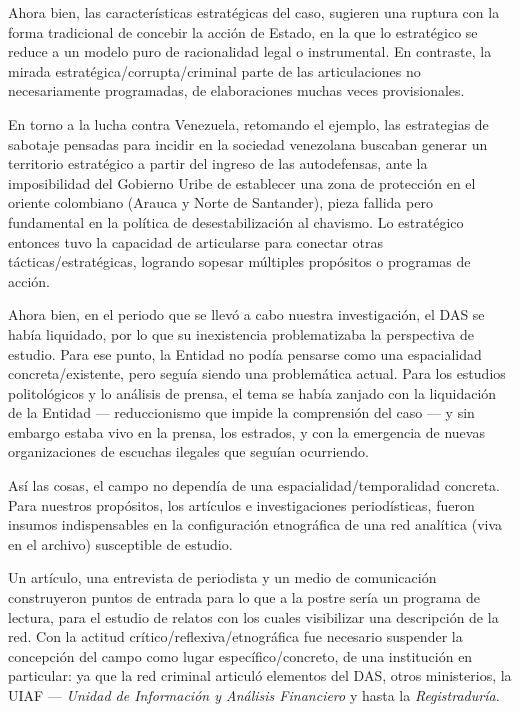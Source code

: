 \documentclass[
  spanish,
  11pt,
  a4paper,
]{scrbook}
\begin{document}
Ahora bien, las características estratégicas del caso, sugieren una
ruptura con la forma tradicional de concebir la acción de Estado, en la
que lo estratégico se reduce a un modelo puro de racionalidad legal o
instrumental. En contraste, la mirada estratégica/corrupta/criminal
parte de las articulaciones no necesariamente programadas, de
elaboraciones muchas veces provisionales.

En torno a la lucha contra Venezuela, retomando el ejemplo, las
estrategias de sabotaje pensadas para incidir en la sociedad venezolana
buscaban generar un territorio estratégico a partir del ingreso de las
autodefensas, ante la imposibilidad del Gobierno Uribe de establecer una
zona de protección en el oriente colombiano (Arauca y Norte de
Santander), pieza fallida pero fundamental en la política de
desestabilización al chavismo. Lo estratégico entonces tuvo la capacidad
de articularse para conectar otras tácticas/estratégicas, logrando
sopesar múltiples propósitos o programas de acción.

Ahora bien, en el periodo que se llevó a cabo nuestra investigación, el
DAS se había liquidado, por lo que su inexistencia problematizaba la
perspectiva de estudio. Para ese punto, la Entidad no podía pensarse
como una espacialidad concreta/existente, pero seguía siendo una
problemática actual. Para los estudios politológicos y lo análisis de
prensa, el tema se había zanjado con la liquidación de la Entidad ---
reduccionismo que impide la comprensión del caso --- y sin embargo
estaba vivo en la prensa, los estrados, y con la emergencia de nuevas
organizaciones de escuchas ilegales que seguían ocurriendo.

Así las cosas, el campo no dependía de una espacialidad/temporalidad
concreta. Para nuestros propósitos, los artículos e investigaciones
periodísticas, fueron insumos indispensables en la configuración
etnográfica de una red analítica (viva en el archivo) susceptible de
estudio.

Un artículo, una entrevista de periodista y un medio de comunicación
construyeron puntos de entrada para lo que a la postre sería un programa
de lectura, para el estudio de relatos con los cuales visibilizar una
descripción de la red. Con la actitud crítico/reflexiva/etnográfica fue
necesario suspender la concepción del campo como lugar
específico/concreto, de una institución en particular: ya que la red
criminal articuló elementos del DAS, otros ministerios, la UIAF ---
\emph{Unidad de Información y Análisis Financiero} y hasta la
\emph{Registraduría.}
\end{document}
